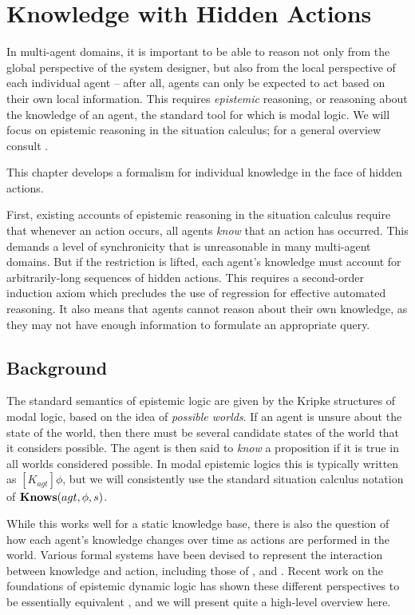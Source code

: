 

\chapter{Knowledge with Hidden Actions}

\label{ch:knowledge}

In multi-agent domains, it is important to be able to reason not only
from the global perspective of the system designer, but also from
the local perspective of each individual agent -- after all, agents
can only be expected to act based on their own local information.
This requires \emph{epistemic} reasoning, or reasoning about the knowledge
of an agent, the standard tool for which is modal logic. We will focus
on epistemic reasoning in the situation calculus; for a general overview
consult \citep{fagin95}.

This chapter develops a formalism for individual knowledge in the
face of hidden actions.

First, existing accounts of epistemic reasoning in the situation calculus
require that whenever an action occurs, all agents \emph{know} that
an action has occurred. This demands a level of synchronicity that
is unreasonable in many multi-agent domains. But if the restriction
is lifted, each agent's knowledge must account for arbitrarily-long
sequences of hidden actions. This requires a second-order induction
axiom which precludes the use of regression for effective automated
reasoning. It also means that agents cannot reason about their own
knowledge, as they may not have enough information to formulate an
appropriate query.


\section{Background}

The standard semantics of epistemic logic are given by the Kripke
structures of modal logic, based on the idea of \emph{possible worlds}.
If an agent is unsure about the state of the world, then there must
be several candidate states of the world that it considers possible.
The agent is then said to \emph{know} a proposition if it is true
in all worlds considered possible. In modal epistemic logics this
is typically written as $[K_{agt}]\phi$, but we will consistently
use the standard situation calculus notation of $\mathbf{Knows}(agt,\phi,s)$.

While this works well for a static knowledge base, there is also the
question of how each agent's knowledge changes over time as actions
are performed in the world. Various formal systems have been devised
to represent the interaction between knowledge and action, including
those of \citet{fagin95}, \citet{parikh85dist_knowledge} and \citet{baltag98pa_ck}.
Recent work on the foundations of epistemic dynamic logic has shown
these different perspectives to be essentially equivalent \citep{vanBentham06tree_of_knowledge,pacuit07history_structures},
and we will present quite a high-level overview here.

